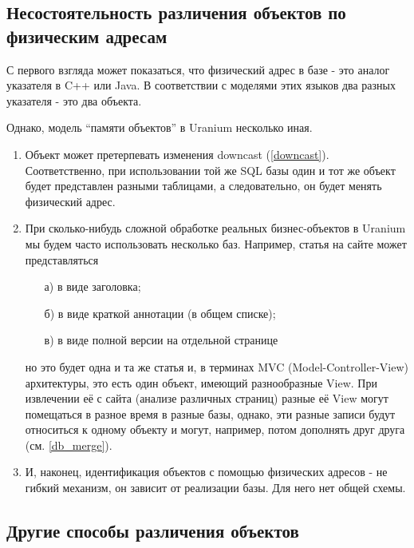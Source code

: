 \documentclass[a4paper]{book}
\def\ur{Uranium}
\begin{document}
\subsection{Несостоятельность различения объектов по физическим
  адресам}

С первого взгляда может показаться, что физический адрес в базе -
это аналог указателя в C++ или Java. В соответствии с моделями
этих языков два разных указателя - это два объекта.

Однако, модель ``памяти объектов'' в Uranium несколько иная.

\begin{enumerate}

\item Объект может претерпевать изменения downcast
  (\ref{downcast}). Соответственно, при использовании той же SQL
  базы один и тот же объект будет представлен разными таблицами,
  а следовательно, он будет менять физический адрес.

\item При сколько-нибудь сложной обработке реальных
  бизнес-объектов в \ur{} мы будем часто использовать несколько
  баз. Например, статья на сайте может представляться
  \begin{itemize}
  \item[а)] в виде заголовка;
  \item[б)] в виде краткой аннотации (в общем списке);
  \item[в)] в виде полной версии на отдельной странице
  \end{itemize}

  но это будет одна и та же статья и, в терминах MVC
  (Model-Controller-View) архитектуры, это есть один объект,
  имеющий разнообразные View. При извлечении её с сайта (анализе
  различных страниц) разные её View могут помещаться в разное
  время в разные базы, однако, эти разные записи будут относиться
  к одному объекту и могут, например, потом дополнять друг друга
  (см. \ref{db_merge}).

\item И, наконец, идентификация объектов с помощью физических
  адресов - не гибкий механизм, он зависит от реализации
  базы. Для него нет общей схемы.

\end{enumerate}


\subsection{Другие способы различения объектов}
\end{document}
